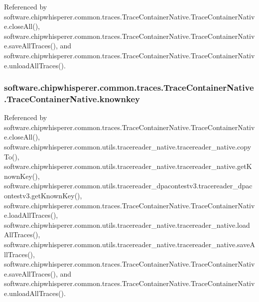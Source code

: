 Referenced by software.\+chipwhisperer.\+common.\+traces.\+Trace\+Container\+Native.\+Trace\+Container\+Native.\+close\+All(), software.\+chipwhisperer.\+common.\+traces.\+Trace\+Container\+Native.\+Trace\+Container\+Native.\+save\+All\+Traces(), and software.\+chipwhisperer.\+common.\+traces.\+Trace\+Container\+Native.\+Trace\+Container\+Native.\+unload\+All\+Traces().

\hypertarget{classsoftware_1_1chipwhisperer_1_1common_1_1traces_1_1TraceContainerNative_1_1TraceContainerNative_ad1c723df08608140a205fd966c387e81}{}
\subsubsection[{knownkey}]{\setlength{\rightskip}{0pt plus 5cm}software.\+chipwhisperer.\+common.\+traces.\+Trace\+Container\+Native.\+Trace\+Container\+Native.\+knownkey}\label{classsoftware_1_1chipwhisperer_1_1common_1_1traces_1_1TraceContainerNative_1_1TraceContainerNative_ad1c723df08608140a205fd966c387e81}


Referenced by software.\+chipwhisperer.\+common.\+traces.\+Trace\+Container\+Native.\+Trace\+Container\+Native.\+close\+All(), software.\+chipwhisperer.\+common.\+utils.\+tracereader\+\_\+native.\+tracereader\+\_\+native.\+copy\+To(), software.\+chipwhisperer.\+common.\+utils.\+tracereader\+\_\+native.\+tracereader\+\_\+native.\+get\+Known\+Key(), software.\+chipwhisperer.\+common.\+utils.\+tracereader\+\_\+dpacontestv3.\+tracereader\+\_\+dpacontestv3.\+get\+Known\+Key(), software.\+chipwhisperer.\+common.\+traces.\+Trace\+Container\+Native.\+Trace\+Container\+Native.\+load\+All\+Traces(), software.\+chipwhisperer.\+common.\+utils.\+tracereader\+\_\+native.\+tracereader\+\_\+native.\+load\+All\+Traces(), software.\+chipwhisperer.\+common.\+utils.\+tracereader\+\_\+native.\+tracereader\+\_\+native.\+save\+All\+Traces(), software.\+chipwhisperer.\+common.\+traces.\+Trace\+Container\+Native.\+Trace\+Container\+Native.\+save\+All\+Traces(), and software.\+chipwhisperer.\+common.\+traces.\+Trace\+Container\+Native.\+Trace\+Container\+Native.\+unload\+All\+Traces().

